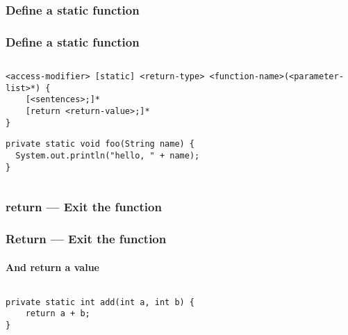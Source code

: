 \documentclass[en, 11pt, xcolor=dvipsnames]{beamer}
\begin{document}
\subsubsection{Define a static function}
\begin{frame}[fragile]
	\frametitle{Define a static function}



	\begin{columns}[c]
		\begin{column}{0.9\textwidth}

			\begin{lstlisting}[style=Java]
<access-modifier> [static] <return-type> <function-name>(<parameter-list>*) {
    [<sentences>;]*
    [return <return-value>;]*
}
\end{lstlisting}

			\begin{lstlisting}[style=Java]
private static void foo(String name) {
  System.out.println("hello, " + name);
}
\end{lstlisting}

		\end{column}
	\end{columns}

\end{frame}

\subsubsection{return --- Exit the function}
\begin{frame}[fragile]
	\frametitle{Return --- Exit the function}
	\framesubtitle{And return a value}



	\begin{columns}[c]
		\begin{column}{0.9\textwidth}

			\begin{lstlisting}[style=Java]
private static int add(int a, int b) {
    return a + b;
}
\end{lstlisting}

		\end{column}
	\end{columns}

\end{frame}
\end{document}
